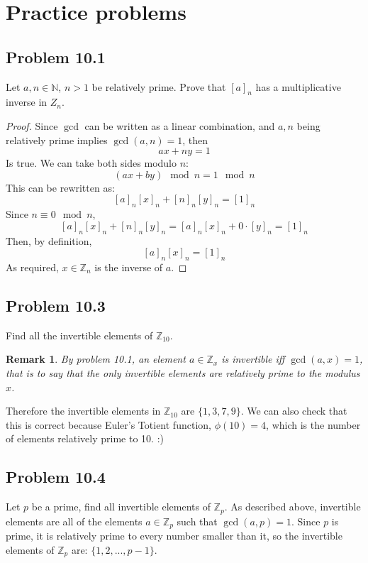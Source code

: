 \documentclass[12pt]{article}
\title{\scalebox{2}{Math 341 Homework 10}}
\author{\scalebox{1.5}{Theo Koss}}
\date{October 2020}
\newtheorem*{remark}{Remark}
\newcommand{\N}{\mathbb{N}}
\newcommand{\Z}{\mathbb{Z}}
\begin{document}
\maketitle
\section{Practice problems}
\subsection{Problem 10.1}
Let $a,n\in\N$, $n>1$ be relatively prime. Prove that $[a]_n$ has a multiplicative inverse in $Z_n$.
\begin{proof}
Since $\gcd$ can be written as a linear combination, and $a,n$ being relatively prime implies $\gcd{(a,n)=1}$, then $$ax+ny=1$$ Is true. We can take both sides modulo $n$:$$(ax+by)\mod{n}=1\mod{n}$$This can be rewritten as:$$[a]_n[x]_n+[n]_n[y]_n=[1]_n$$Since $n\equiv0\mod{n}$, $$[a]_n[x]_n+[n]_n[y]_n=[a]_n[x]_n+0\cdot[y]_n=[1]_n$$Then, by definition, $$[a]_n[x]_n=[1]_n$$As required, $x\in\Z_n$ is the inverse of $a$.
\end{proof}
\subsection{Problem 10.3}
Find all the invertible elements of $\Z_{10}$.
\newline \begin{remark}
By problem 10.1, an element $a\in\Z_{x}$ is invertible iff $\gcd{(a,x)}=1$, that is to say that the only invertible elements are relatively prime to the modulus $x$.\end{remark}
Therefore the invertible elements in $\Z_{10}$ are $\{1,3,7,9\}$. We can also check that this is correct because Euler's Totient function, $\phi(10)=4$, which is the number of elements relatively prime to 10. :)
\subsection{Problem 10.4}
Let $p$ be a prime, find all invertible elements of $\Z_{p}$.
\newline As described above, invertible elements are all of the elements $a\in\Z_{p}$ such that $\gcd{(a,p)=1}$. Since $p$ is prime, it is relatively prime to every number smaller than it, so the invertible elements of $\Z_{p}$ are: $\{1,2,...,p-1\}$.
\end{document}
